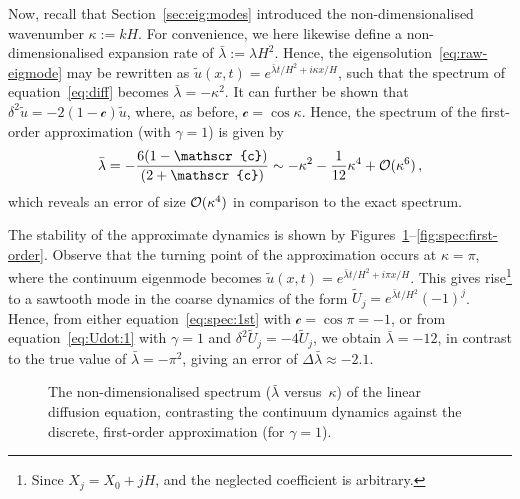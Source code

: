 \documentclass[12pt,a5paper]{article}
\newcommand{\bcurs}[1]{\text{$\mathscr{#1}$}}
\begin{document}
Now, recall that Section~\ref{sec:eig:modes} introduced the non-dimensionalised wavenumber $\kappa:=kH$. 
For convenience, we here likewise define a non-dimensionalised expansion rate of $\bar{\lambda}:=\lambda H^2$.
Hence, the eigensolution~\eqref{eq:raw-eigmode} may be rewritten as $\tilde{u}(x,t)=e^{\bar{\lambda}t/H^2+i\kappa x/H}$, 
such that the spectrum of equation~\eqref{eq:diff} becomes $\bar{\lambda}=-\kappa^2$.
It can further be shown that
$\delta^2\tilde{u}=-2(1-\bcurs{c})\tilde{u}$, where, as before, $\bcurs{c}=\cos\kappa$. 
Hence, the spectrum of the first-order approximation (with $\gamma=1$) is given by
\begin{eqnarray}
\bar{\lambda} = -\frac{6(1-\bcurs{c})}{(2+\bcurs{c})} \sim -\kappa^2-\frac{1}{12}\kappa^4+{\cal O}(\kappa^6)\,,
\label{eq:spec:1st}
\end{eqnarray}
which reveals an error of size ${\cal O}(\kappa^4)$ in comparison to the exact spectrum.

The stability of the approximate dynamics is shown by Figures~\ref{fig:spec:first-order:nd}--\ref{fig:spec:first-order}.
Observe that the turning point of the approximation occurs at $\kappa=\pi$,
where the continuum eigenmode becomes
 $\tilde{u}(x,t)=e^{\bar{\lambda}t/H^2+i\pi x/H}$.
This gives rise\footnote{Since $X_j=X_0+jH$, and the neglected coefficient is arbitrary.} 
to a sawtooth mode in the coarse dynamics of the form $\tilde{U}_j=e^{\bar{\lambda}t/H^2}(-1)^{j}$.
Hence, from either equation~\eqref{eq:spec:1st} with $\bcurs{c}=\cos\pi=-1$, or from 
 equation~\eqref{eq:Udot:1} with $\gamma=1$ and $\delta^2\tilde{U}_j=-4\tilde{U}_j$,
we obtain $\bar{\lambda}=-12$, in contrast to the true value of
$\bar{\lambda}=-\pi^2$, giving an error of $\Delta\bar{\lambda}\approx-2.1$.
\begin{figure}[hbt]
\centering
{}
\caption{The  non-dimensionalised spectrum ($\bar{\lambda}$ versus~$\kappa$) of the linear diffusion equation, contrasting the 
continuum dynamics against the discrete, first-order approximation (for $\gamma=1$).}
\label{fig:spec:first-order:nd}
\end{figure}
\end{document}
